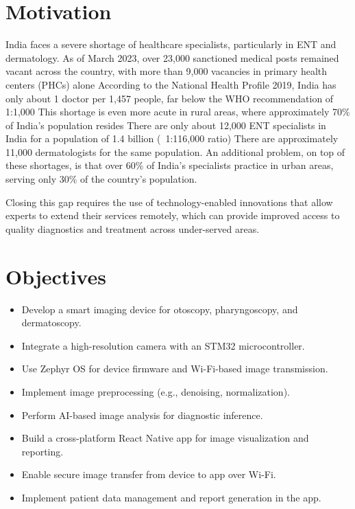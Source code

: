 \section{Motivation}
India faces a severe shortage of healthcare specialists, particularly in ENT and dermatology. As of March 2023, over 23,000 sanctioned medical posts remained vacant across the country, with more than 9,000 vacancies in primary health centers (PHCs) alone
According to the National Health Profile 2019, India has only about 1 doctor per 1,457 people, far below the WHO recommendation of 1:1,000
This shortage is even more acute in rural areas, where approximately 70\% of India's population resides
There are only about 12,000 ENT specialists in India for a population of 1.4 billion (~1:116,000 ratio)
There are approximately 11,000 dermatologists for the same population. 
An additional problem, on top of these shortages, is that over 60\% of India's specialists practice in urban areas, serving only 30\% of the country's population. \par
Closing this gap requires the use of technology-enabled innovations that allow experts to extend their services remotely, which can provide improved access to quality diagnostics and treatment across under-served areas.

\section{Objectives}
\begin{itemize}
\item Develop a smart imaging device for otoscopy, pharyngoscopy, and dermatoscopy.
\item Integrate a high-resolution camera with an STM32 microcontroller.
\item Use Zephyr OS for device firmware and Wi-Fi-based image transmission.
\item Implement image preprocessing (e.g., denoising, normalization).
\item Perform AI-based image analysis for diagnostic inference.
\item Build a cross-platform React Native app for image visualization and reporting.
\item Enable secure image transfer from device to app over Wi-Fi.
\item Implement patient data management and report generation in the app.
\end{itemize}
